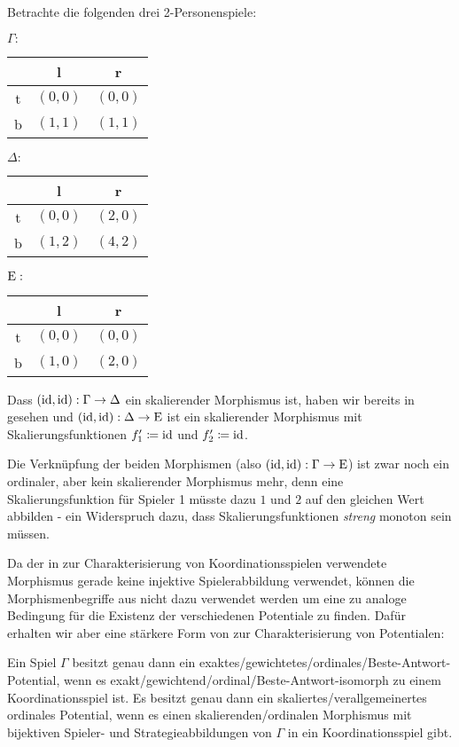 \begin{bsp}\label{bsp:GegenbspKompositionSkMorphismen}
	Betrachte die folgenden drei 2-Personenspiele:
	\begin{center}
		$\Gamma:$ \quad
		\begin{tabular}{c||c|c}
			& l 		& r 		\\\hline\hline
			t	& $(0,0)$	& $(0,0)$	\\\hline
			b	& $(1,1)$	& $(1,1)$ 
		\end{tabular}\hspace{3em}
		$\Delta:$ \quad
		\begin{tabular}{c||c|c}
			& l 		& r 		\\\hline\hline
		t	& $(0,0)$	& $(2,0)$	\\\hline
		b	& $(1,2)$	& $(4,2)$ 
		\end{tabular}\hspace{3em}
		$\mathrm{E}:$ \quad
		\begin{tabular}{c||c|c}
			& l 		& r 		\\\hline\hline
			t	& $(0,0)$	& $(0,0)$	\\\hline
			b	& $(1,0)$	& $(2,0)$ 
		\end{tabular}
	\end{center}
	Dass $(\mathrm{id}, \mathrm{id}): \Gamma \to \Delta$ ein skalierender Morphismus ist, haben wir bereits in  gesehen und $(\mathrm{id}, \mathrm{id}): \Delta \to \mathrm{E}$ ist ein skalierender Morphismus mit Skalierungsfunktionen $f'_1 \coloneqq \mathrm{id}$ und $f'_2 \coloneqq \mathrm{id}$. 
	
	Die Verknüpfung der beiden Morphismen (also $(\mathrm{id}, \mathrm{id}): \Gamma \to \mathrm{E}$) ist zwar noch ein ordinaler, aber kein skalierender Morphismus mehr, denn eine Skalierungsfunktion für Spieler 1 müsste dazu $1$ und $2$ auf den gleichen Wert abbilden - ein Widerspruch dazu, dass Skalierungsfunktionen \emph{streng} monoton sein müssen.
\end{bsp}


Da der in  zur Charakterisierung von Koordinationsspielen verwendete Morphismus gerade keine injektive Spielerabbildung verwendet, können die Morphismenbegriffe aus  nicht dazu verwendet werden um eine zu  analoge Bedingung für die Existenz der verschiedenen Potentiale zu finden. Dafür erhalten wir aber eine stärkere Form von  zur Charakterisierung von Potentialen:

\begin{prop}\label{prop:CharPotentialeDurchIsos}
	Ein Spiel $\Gamma$ besitzt genau dann ein exaktes/gewichtetes/ordinales/Beste-Antwort-Potential, wenn es exakt/gewichtend/ordinal/Beste-Antwort-isomorph zu einem Koordinationsspiel ist. Es besitzt genau dann ein skaliertes/verallgemeinertes ordinales Potential, wenn es einen skalierenden/ordinalen Morphismus mit bijektiven Spieler- und Strategieabbildungen von $\Gamma$ in ein Koordinationsspiel gibt.
\end{prop}

